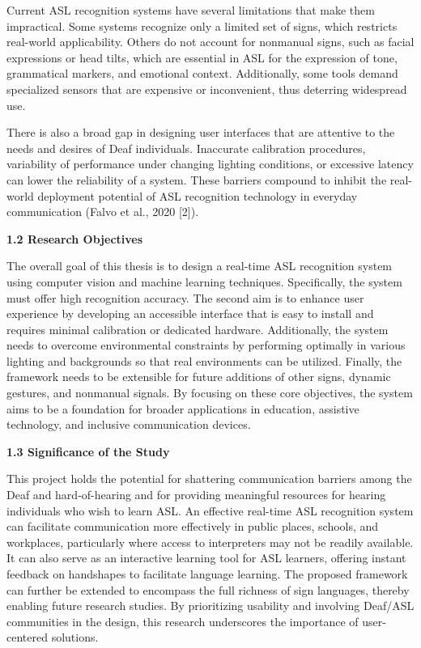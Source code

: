\documentclass[12pt]{article}
\begin{document}
Current ASL recognition systems have several limitations that make them impractical. Some systems 
recognize only a limited set of signs, which restricts real-world applicability. Others do not 
account for nonmanual signs, such as facial expressions or head tilts, which are essential in ASL 
for the expression of tone, grammatical markers, and emotional context. Additionally, some tools 
demand specialized sensors that are expensive or inconvenient, thus deterring widespread use.

There is also a broad gap in designing user interfaces that are attentive to the needs and desires 
of Deaf individuals. Inaccurate calibration procedures, variability of performance under changing 
lighting conditions, or excessive latency can lower the reliability of a system. These barriers 
compound to inhibit the real-world deployment potential of ASL recognition technology in everyday 
communication (Falvo et al., 2020 [2]).

\vspace{1.5em}
\noindent
\textbf{1.2 Research Objectives}
\vspace{1.5em}

The overall goal of this thesis is to design a real-time ASL recognition system using computer 
vision and machine learning techniques. Specifically, the system must offer high recognition 
accuracy. The second aim is to enhance user experience by developing an accessible interface that 
is easy to install and requires minimal calibration or dedicated hardware. Additionally, the system 
needs to overcome environmental constraints by performing optimally in various lighting and 
backgrounds so that real environments can be utilized. Finally, the framework needs to be extensible 
for future additions of other signs, dynamic gestures, and nonmanual signals. By focusing on these 
core objectives, the system aims to be a foundation for broader applications in education, assistive 
technology, and inclusive communication devices.

\vspace{1.5em}
\noindent
\textbf{1.3 Significance of the Study}
\vspace{1.5em}

This project holds the potential for shattering communication barriers among the Deaf and 
hard-of-hearing and for providing meaningful resources for hearing individuals who wish to learn 
ASL. An effective real-time ASL recognition system can facilitate communication more effectively 
in public places, schools, and workplaces, particularly where access to interpreters may not be 
readily available. It can also serve as an interactive learning tool for ASL learners, offering 
instant feedback on handshapes to facilitate language learning. The proposed framework can further 
be extended to encompass the full richness of sign languages, thereby enabling future research 
studies. By prioritizing usability and involving Deaf/ASL communities in the design, this research 
underscores the importance of user-centered solutions.
\end{document}

